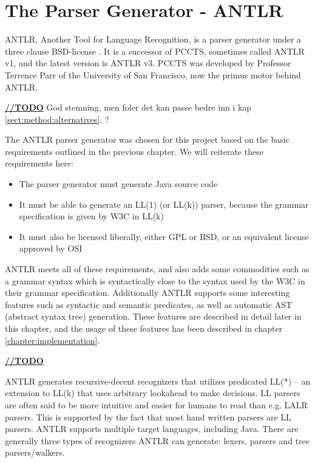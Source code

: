 \chapter{The Parser Generator - ANTLR}
\label{sect:antlr}
ANTLR, Another Tool for Language Recognition, is a parser generator under a
three clause BSD-license \cite{antlrorg}.  It is a successor of PCCTS,
sometimes called ANTLR v1, and the latest version is ANTLR v3. PCCTS was
developed by Professor Terrence Parr of the University of San Francisco, now
the primus motor behind ANTLR.

\underline{\textbf{\LARGE //TODO}} God stemning, men foler det kan passe bedre inn i kap \ref{sect:method:alternatives}. ?


The ANTLR parser generator was chosen for this project based on the basic 
requirements outlined in the previous chapter. We will reiterate these
requirements here:
\begin{itemize}
  \item The parser generator must generate Java source code
  \item It must be able to generate an LL(1) (or LL(k)) parser, because the
  grammar specification is given by W3C in LL(k)
  \item It must also be licensed liberally, either GPL or BSD, or an equivalent
  license approved by OSI
\end{itemize}
ANTLR meets all of these requirements, and also adds some commodities such as a
grammar syntax which is syntactically close to the syntax used by the W3C in
their grammar specification\cite{w3c01}. Additionally ANTLR supports some
interesting features such as syntactic and semantic predicates, as well as
automatic AST (abstract syntax tree) generation. These features are described in
detail later in this chapter, and the usage of these features has been described
in chapter \ref{chapter:implementation}.

\underline{\textbf{\LARGE //TODO}}


ANTLR generates recursive-decent recognizers that utilizes predicated LL(*) --
an extension to LL(k) that uses arbitrary lookahead to make decisions. LL
parsers are often said to be more intuitive and easier for humans to read than
e.g. LALR parsers. This is supported by the fact that most hand written parsers
are LL parsers. ANTLR supports multiple target languages, including Java. There
are generally three types of recognizers ANTLR can generate: lexers, parsers
and tree parsers/walkers.      


